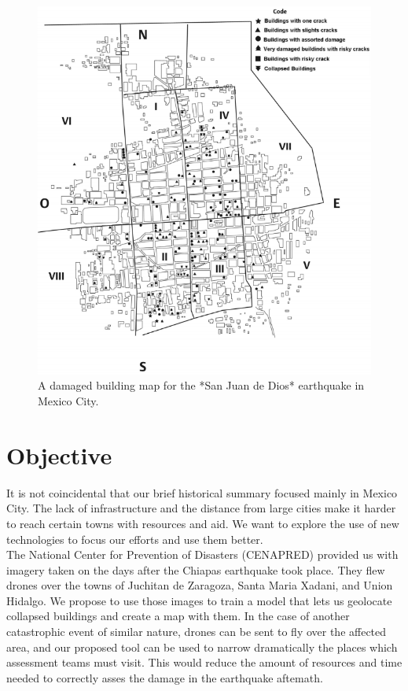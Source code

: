 \begin{figure}[h]
  \centering
  \includegraphics[width=1\textwidth]{images/quake1800.png}
  \caption{A damaged building map for the *San Juan de Dios* earthquake in Mexico City.}
  \label{fig:quake1800}
\end{figure}



\section{Objective}

It is not coincidental that our brief historical summary focused mainly in Mexico City. The lack of infrastructure and the distance from large cities make it harder to reach certain towns with resources and aid. We want to explore the use of new technologies to focus our efforts and use them better.\\

The National Center for Prevention of Disasters (CENAPRED) provided us with imagery taken on the days after the Chiapas earthquake took place. They flew drones over the towns of Juchitan de Zaragoza, Santa Maria Xadani, and Union Hidalgo. We propose to use those images to train a model that lets us geolocate collapsed buildings and create a map with them. In the case of another catastrophic event of similar nature, drones can be sent to fly over the affected area, and our proposed tool can be used to narrow dramatically the places which assessment teams must visit. This would reduce the amount of resources and time needed to correctly asses the damage in the earthquake aftemath.\\


